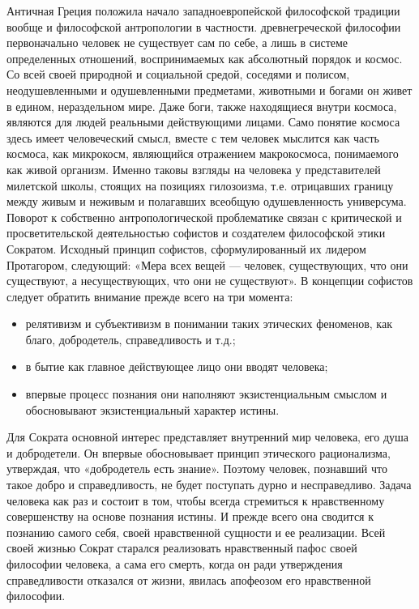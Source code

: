 \documentclass[12pt]{article}
\begin{document}
Античная  Греция  положила  начало  западноевропейской  философской  традиции  вообще  и  философской
антропологии в частности. древнегреческой философии первоначально человек не существует сам по себе, а
лишь в системе определенных отношений, воспринимаемых как абсолютный порядок и космос. Со всей своей
природной  и  социальной  средой,  соседями  и  полисом,  неодушевленными  и  одушевленными  предметами,
животными и богами он живет в едином, нераздельном мире. Даже боги, также находящиеся внутри космоса,
являются  для  людей  реальными  действующими  лицами.  Само  понятие  космоса  здесь  имеет  человеческий
смысл,  вместе  с  тем  человек  мыслится  как  часть  космоса,  как  микрокосм,  являющийся  отражением
макрокосмоса,  понимаемого  как  живой  организм.  Именно  таковы  взгляды  на  человека  у  представителей
милетской школы, стоящих на позициях гилозоизма, т.е. отрицавших границу между живым и неживым и
полагавших всеобщую одушевленность универсума.
Поворот  к  собственно  антропологической  проблематике  связан  с  критической  и  просветительской
деятельностью софистов и создателем философской этики Сократом.
Исходный принцип софистов, сформулированный их лидером Протагором, следующий: «Мера всех вещей —
человек, существующих, что они существуют, а несуществующих, что они не существуют».
В концепции софистов следует обратить внимание прежде всего на три момента:
\begin{itemize}
  \item релятивизм и субъективизм в понимании таких этических феноменов, как благо, добродетель, справедливость  
и т.д.;
\item в бытие как главное действующее лицо они вводят человека;
\item впервые процесс познания они наполняют экзистенциальным смыслом и обосновывают экзистенциальный
характер истины.
\end{itemize}
Для Сократа основной интерес представляет внутренний мир человека, его душа и добродетели. Он впервые
обосновывает принцип этического рационализма, утверждая, что «добродетель есть знание». Поэтому человек,
познавший что такое добро и справедливость, не будет поступать дурно и несправедливо. Задача человека как
раз и состоит в том, чтобы всегда стремиться к нравственному совершенству на основе познания истины. И
прежде всего она сводится к познанию самого себя, своей нравственной сущности и ее реализации.
Всей своей жизнью Сократ старался реализовать нравственный пафос своей философии человека, а сама его
смерть, когда он ради утверждения справедливости отказался от жизни, явилась апофеозом его нравственной
философии.
\end{document}
